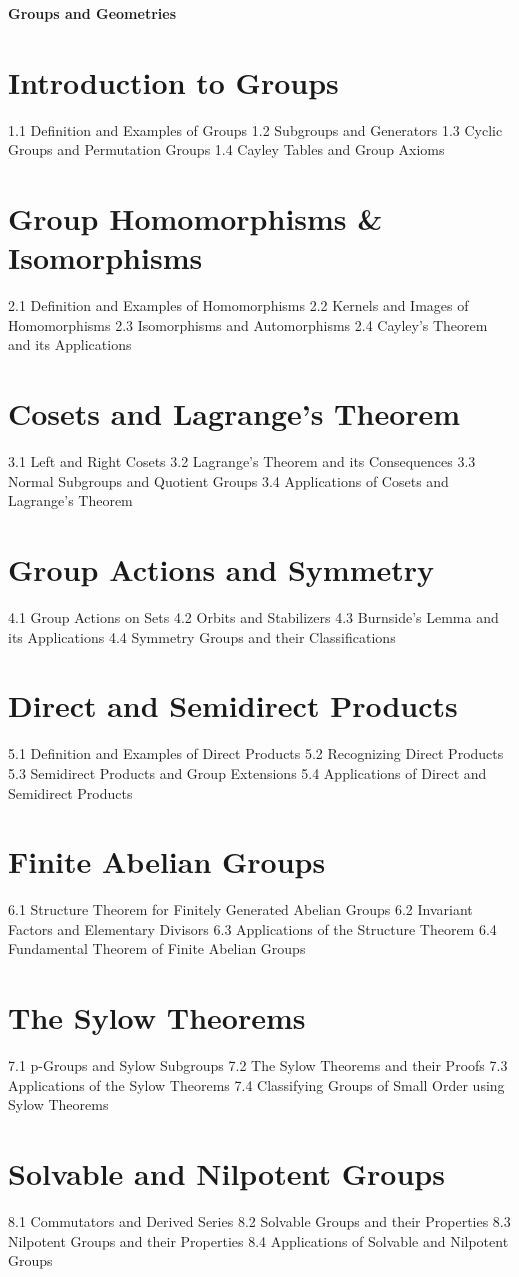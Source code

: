 {\LARGE \bf{Groups and Geometries}}
\section{Introduction to Groups}
1.1 Definition and Examples of Groups
1.2 Subgroups and Generators
1.3 Cyclic Groups and Permutation Groups
1.4 Cayley Tables and Group Axioms
\section{Group Homomorphisms \& Isomorphisms}
2.1 Definition and Examples of Homomorphisms
2.2 Kernels and Images of Homomorphisms
2.3 Isomorphisms and Automorphisms
2.4 Cayley's Theorem and its Applications
\section{Cosets and Lagrange's Theorem}
3.1 Left and Right Cosets
3.2 Lagrange's Theorem and its Consequences
3.3 Normal Subgroups and Quotient Groups
3.4 Applications of Cosets and Lagrange's Theorem
\section{Group Actions and Symmetry}
4.1 Group Actions on Sets
4.2 Orbits and Stabilizers
4.3 Burnside's Lemma and its Applications
4.4 Symmetry Groups and their Classifications
\section{Direct and Semidirect Products}
5.1 Definition and Examples of Direct Products
5.2 Recognizing Direct Products
5.3 Semidirect Products and Group Extensions
5.4 Applications of Direct and Semidirect Products
\section{Finite Abelian Groups}
6.1 Structure Theorem for Finitely Generated Abelian Groups
6.2 Invariant Factors and Elementary Divisors
6.3 Applications of the Structure Theorem
6.4 Fundamental Theorem of Finite Abelian Groups
\section{The Sylow Theorems}
7.1 p-Groups and Sylow Subgroups
7.2 The Sylow Theorems and their Proofs
7.3 Applications of the Sylow Theorems
7.4 Classifying Groups of Small Order using Sylow Theorems
\section{Solvable and Nilpotent Groups}
8.1 Commutators and Derived Series
8.2 Solvable Groups and their Properties
8.3 Nilpotent Groups and their Properties
8.4 Applications of Solvable and Nilpotent Groups
